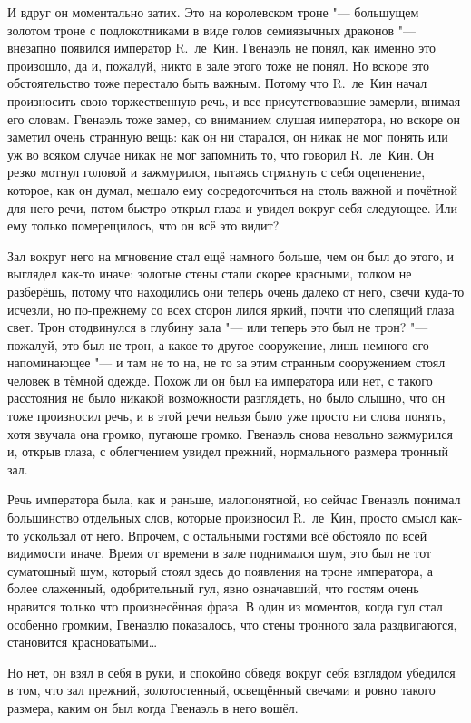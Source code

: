 И вдруг он моментально затих.
Это на королевском троне "--- большущем золотом троне с подлокотниками в виде
голов семиязычных драконов "--- внезапно появился император R.~ле~Кин.
Гвенаэль не понял, как именно это произошло, да и, пожалуй, никто в зале этого
тоже не понял.
Но вскоре это обстоятельство тоже перестало быть важным.
Потому что R.~ле~Кин начал произносить свою торжественную речь, и все
присутствовавшие замерли, внимая его словам.
Гвенаэль тоже замер, со вниманием слушая императора, но вскоре он заметил очень
странную вещь: как он ни старался, он никак не мог понять или уж во всяком
случае никак не мог запомнить то, что говорил R.~ле~Кин.
Он резко мотнул головой и зажмурился, пытаясь стряхнуть с себя оцепенение,
которое, как он думал, мешало ему сосредоточиться на столь важной и почётной для
него речи, потом быстро открыл глаза и увидел вокруг себя следующее.
Или ему только померещилось, что он всё это видит?

Зал вокруг него на мгновение стал ещё намного больше, чем он был до этого, и
выглядел как-то иначе: золотые стены стали скорее красными, толком не разберёшь,
потому что находились они теперь очень далеко от него, свечи куда-то исчезли, но
по-прежнему со всех сторон лился яркий, почти что слепящий глаза свет.
Трон отодвинулся в глубину зала "--- или теперь это был не трон? "--- пожалуй,
это был не трон, а какое-то другое сооружение, лишь немного его напоминающее
"--- и там не то на, не то за этим странным сооружением стоял человек в тёмной
одежде.
Похож ли он был на императора или нет, с такого расстояния не было никакой
возможности разглядеть, но было слышно, что он тоже произносил речь, и в этой
речи нельзя было уже просто ни слова понять, хотя звучала она громко, пугающе
громко.
Гвенаэль снова невольно зажмурился и, открыв глаза, с облегчением увидел
прежний, нормального размера тронный зал.

Речь императора была, как и раньше, малопонятной, но сейчас Гвенаэль понимал
большинство отдельных слов, которые произносил R.~ле~Кин, просто смысл как-то
ускользал от него.
Впрочем, с остальными гостями всё обстояло по всей видимости иначе.
Время от времени в зале поднимался шум, это был не тот суматошный шум, который
стоял здесь до появления на троне императора, а более слаженный, одобрительный
гул, явно означавший, что гостям очень нравится только что произнесённая фраза.
В один из моментов, когда гул стал особенно громким, Гвенаэлю показалось, что
стены тронного зала раздвигаются, становится красноватыми\ldots

Но нет, он взял в себя в руки, и спокойно обведя вокруг себя взглядом убедился в
том, что зал прежний, золотостенный, освещённый свечами и ровно такого размера,
каким он был когда Гвенаэль в него вошёл.

